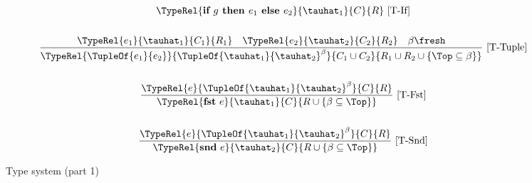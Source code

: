 \begin{figure}[h!t]
\begin{gather*}
{\begin{gathered}
     \end{gathered}}
    {\TypeRel{\textbf{if\ }g\textbf{\ then\ }e_1\textbf{\ else\ }e_2}{\tauhat_1}{C}{R}}
    \mbox{\ [T-If]}\\ \\ %
\frac
    {\TypeRel{e_1}{\tauhat_1}{C_1}{R_1} \quad \TypeRel{e_2}{\tauhat_2}{C_2}{R_2} \quad \beta \fresh}
    {\TypeRel{\TupleOf{e_1}{e_2}}{\TupleOf{\tauhat_1}{\tauhat_2}^\beta}{C_1 \cup C_2}{R_1 \cup R_2 \cup \{ \Top \subseteq \beta \}}}
    \mbox{\ [T-Tuple]}\\ \\  %
\frac
    {\TypeRel{e}{\TupleOf{\tauhat_1}{\tauhat_2}^\beta}{C}{R}}
    {\TypeRel{\textbf{fst}\ e}{\tauhat_1}{C}{R \cup \{ \beta \subseteq \Top \}}}
    \mbox{\ [T-Fst]}\\ \\ %
\frac
    {\TypeRel{e}{\TupleOf{\tauhat_1}{\tauhat_2}^\beta}{C}{R}}
    {\TypeRel{\textbf{snd}\ e}{\tauhat_2}{C}{R \cup \{ \beta \subseteq \Top \}}}
    \mbox{\ [T-Snd]}  %
\end{gather*}
\vfill
\caption{Type system (part 1)}
\label{DeclarativeTypeSystem}
\end{figure}
